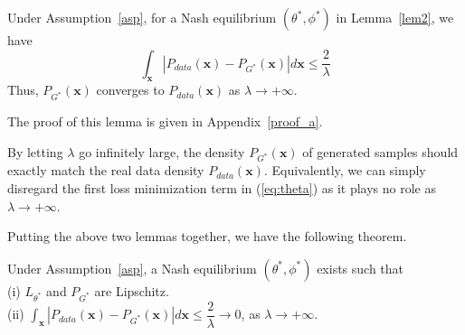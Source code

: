 



\begin{lemma}\label{lem1}
{Under Assumption~\ref{asp}, for a Nash equilibrium $(\theta^*,\phi^*)$ in Lemma~\ref{lem2}, we have
$$
\int_{\mathbf x}|P_{data}(\mathbf x)-P_{G^*}(\mathbf x)|d\mathbf x \leq \dfrac{2}{\lambda}
$$
Thus, $P_{G^*}(\mathbf x)$ converges to $P_{data}(\mathbf x)$ as $\lambda\rightarrow+\infty$.}
\end{lemma}
The proof of this lemma is given in Appendix~\ref{proof_a}.
\begin{remark}
By letting $\lambda$ go infinitely large, the density $P_{G^*}(\mathbf x)$ of generated samples should exactly match the real data density $P_{data}(\mathbf x)$.  Equivalently, we can simply disregard the first loss minimization term in (\ref{eq:theta}) as it plays no role as $\lambda\rightarrow+\infty$.
\end{remark}




Putting the above two lemmas together, we have the following theorem.
\begin{theorem}\label{thm3}
Under Assumption~\ref{asp}, a Nash equilibrium $(\theta^*,\phi^*)$ exists such that\\
(i) $L_{\theta^*}$ and $P_{G^*}$ are Lipschitz.\\
(ii) $\int_{\mathbf x}|P_{data}(\mathbf x)-P_{G^*}(\mathbf x)|d\mathbf x \leq \dfrac{2}{\lambda}\rightarrow 0$, as $\lambda \rightarrow +\infty$.\\
\end{theorem}




